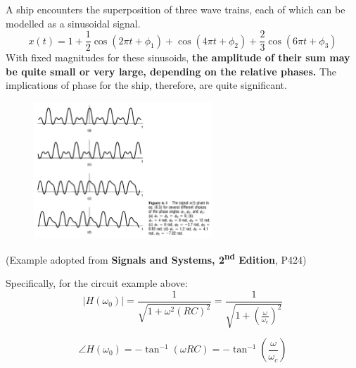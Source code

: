 \begin{ex}{}
    A ship encounters the superposition of three wave trains, each of which can be modelled as a sinusoidal signal. 
    \[ 
    x(t) = 1+\frac{1}{2}\cos(2\pi t + \phi_{1})+\cos(4\pi t + \phi_{2})+\frac{2}{3}\cos(6\pi t + \phi_{3})
    \]
    With fixed magnitudes for these sinusoids, \textbf{the amplitude of their sum may be quite small or very large, depending on the relative phases.} The implications of phase for the ship, therefore, are quite significant. 
    \begin{figure}[H] 
        \centering
        \includegraphics[width=0.6\textwidth]{images/phase}
    \end{figure}
    (Example adopted from \textbf{Signals and Systems, 2\textsuperscript{nd} Edition}, P424)
\end{ex}

Specifically, for the circuit example above:
\[ 
\lvert H(\omega_{0}) \rvert =  \frac{1}{\sqrt{1+\omega^{2}(RC)^{2} }} = \frac{1}{\sqrt{1+(\frac{\omega}{\omega_{c}})^{2}}} 
\]

\[ 
\angle H(\omega_{0}) = -\tan^{-1}(\omega RC) = -\tan^{-1}(\frac{\omega}{\omega_{c}})
\]

